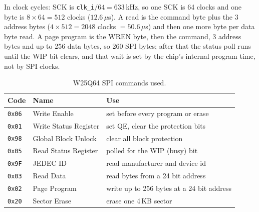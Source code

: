 \documentclass[a4paper,10pt]{article}
\begin{document}
In clock cycles: SCK is \texttt{clk\_i}$/64 = 633$\,kHz, so one SCK is 64 clocks and one
byte is $8\times64 = 512$ clocks ($12.6\,\mu$s). A read is the command byte plus the 3
address bytes ($4\times512 = 2048$ clocks $= 50.6\,\mu$s) and then one more byte per data
byte read. A page program is the WREN byte, then the command, 3 address bytes and up to
256 data bytes, so 260 SPI bytes; after that the status poll runs until the WIP bit
clears, and that wait is set by the chip's internal program time, not by SPI clocks.

\begin{table}[H]
\centering
\caption{W25Q64 SPI commands used.}
\label{tab:nor-cmd}
\begin{tabular}{lll}
\hline
Code & Name & Use \\
\hline
\texttt{0x06} & Write Enable & set before every program or erase \\
\texttt{0x01} & Write Status Register & set QE, clear the protection bits \\
\texttt{0x98} & Global Block Unlock & clear all block protection \\
\texttt{0x05} & Read Status Register & polled for the WIP (busy) bit \\
\texttt{0x9F} & JEDEC ID & read manufacturer and device id \\
\texttt{0x03} & Read Data & read bytes from a 24 bit address \\
\texttt{0x02} & Page Program & write up to 256 bytes at a 24 bit address \\
\texttt{0x20} & Sector Erase & erase one 4\,KB sector \\
\hline
\end{tabular}
\end{table}
\end{document}
